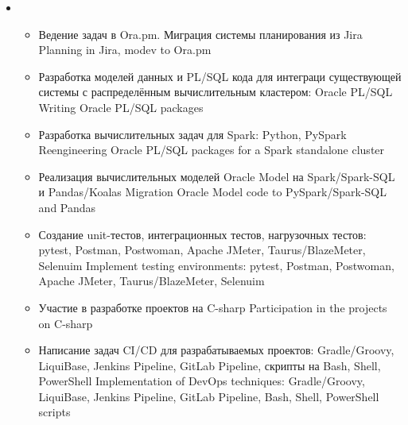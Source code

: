 \documentclass[11pt,a4paper,sans]{moderncv}        %
\begin{document}
{\begin{itemize}
\begin{itemize}
				{Desing and implementation of Hadoop-based calculation cluster: Hadoop HDFS/YARN, ZooKeeper, Spark, Hive, Kyuubi Thrift JDBS/ODBC Server, Alluxio}
			\item {}
				{Проработка целевой архитектуры распределённой вычислительной системы с использованием различных стеков технологий}
				{Architecture desing for a distributed calculation subsystem to migrate from Oracle Model}
			\item {}
				{Проработка архитектуры прикладного программного обеспечения и взаимодействия компонент разрабатываемого решения}
				{System architecture desing for all software components of the projects}
			\item {}
				{Участие в технических совещаниях с заказчиком, участие в защите решения у заказчика, написание технической документации}
				{Participation in technical meetings with customers, writing technical documentation}
		\end{itemize}
		\item {}
		\begin{itemize}
			\item {}
				{Ведение задач в Ora.pm. Миграция системы планирования из Jira}
				{Planning in Jira, modev to Ora.pm}
			\item {}
				{Разработка моделей данных и PL/SQL кода для интеграци существующей системы с распределённым вычислительным кластером: Oracle PL/SQL}
				{Writing Oracle PL/SQL packages}
			\item {}
				{Разработка вычислительных задач для Spark: Python, PySpark}
				{Reengineering Oracle PL/SQL packages for a Spark standalone cluster}
			\item {}
				{Реализация вычислительных моделей Oracle Model на Spark/Spark-SQL и Pandas/Koalas}
				{Migration Oracle Model code to PySpark/Spark-SQL and Pandas}
			\item {}
				{Создание unit-тестов, интеграционных тестов, нагрузочных тестов: pytest, Postman, Postwoman, Apache JMeter, Taurus/BlazeMeter, Selenuim}
				{Implement testing environments: pytest, Postman, Postwoman, Apache JMeter, Taurus/BlazeMeter, Selenuim}
			\item {}
				{Участие в разработке проектов на C-sharp}
				{Participation in the projects on C-sharp}
			\item {}
				{Написание задач CI/CD для разрабатываемых проектов: Gradle/Groovy, LiquiBase, Jenkins Pipeline, GitLab Pipeline, скрипты на Bash, Shell, PowerShell}
				{Implementation of DevOps techniques: Gradle/Groovy, LiquiBase, Jenkins Pipeline, GitLab Pipeline, Bash, Shell, PowerShell scripts}	
		\end{itemize}
	\end{itemize}
}
\end{document}
